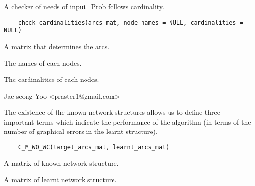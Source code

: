 \documentclass[a4paper]{book}
\begin{document}
%
\begin{Description}\relax
A checker of needs of input\_Prob follows cardinality.
\end{Description}
%
\begin{Usage}
\begin{verbatim}
	check_cardinalities(arcs_mat, node_names = NULL, cardinalities = NULL)
\end{verbatim}
\end{Usage}
%
\begin{Arguments}
\begin{ldescription}
\item[\code{arcs\_mat}]  A matrix that determines the arcs. 
\item[\code{node\_names}]  The names of each nodes. 
\item[\code{cardinalities}]  The cardinalities of each nodes. 
\end{ldescription}
\end{Arguments}
%
\begin{Author}\relax
 Jae-seong Yoo <praster1@gmail.com> 
\end{Author}
%
\begin{Description}\relax
The existence of the known network structures allows us to define three important terms which indicate the performance of the algorithm (in terms of the number of graphical errors in the learnt structure).
\end{Description}
%
\begin{Usage}
\begin{verbatim}
	C_M_WO_WC(target_arcs_mat, learnt_arcs_mat)
\end{verbatim}
\end{Usage}
%
\begin{Arguments}
\begin{ldescription}
\item[\code{target\_arcs\_mat}]  A matrix of known network structure. 
\item[\code{learnt\_arcs\_mat}]  A matrix of learnt network structure. 
\end{ldescription}
\end{Arguments}
%
\end{document}
